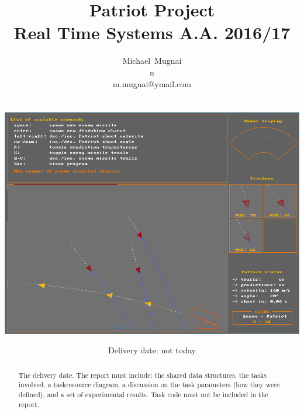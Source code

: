 \documentclass[notitlepage,a4paper,11pt]{article} %
\title{Patriot Project \\
	\large Real Time Systems A.A. 2016/17}
\author{Michael~Mugnai\\n\textdegree 556448\\m.mugnai@ymail.com \\ \\ \\
	\includegraphics[width=\textwidth]{cover}}
\date{Delivery date: not today}
\begin{document}
\maketitle

\begin{abstract} %
	The delivery date.
	The report must include:
	the shared data structures, the tasks involved, a taskresource diagram, a discussion on the task
	parameters (how they were defined), and a set of experimental results.
	Task code must not be included in the report.
\end{abstract}

\newpage
\hypersetup{linkcolor=black}
\tableofcontents
\hypersetup{linkcolor=blue}
\newpage

\end{document}

